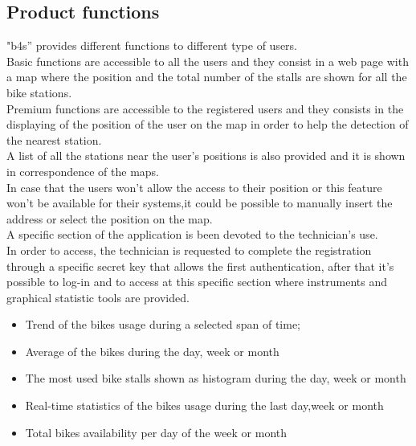 \documentclass{article}
\begin{document}
\subsection{Product functions}
"b4s” provides different functions to different type of users.\\
Basic functions are accessible to all the users and they consist in a web page with a map where the position and the total number of the stalls are shown for all the bike stations.\\
Premium functions are accessible to the registered users and they consists in the displaying of the position of the user on the map in order to help the detection of the nearest station.\\
A list of all the stations near the user's positions is also provided and it is shown in correspondence of the maps.\\
In case that the users won’t allow the access to their position or this feature won't be available for their systems,it could be possible to manually insert the address or select the position on the map.\\
A specific section of the application is been devoted to the technician’s use.\\
In order to access, the technician is requested to complete the registration through a specific secret key that allows the first authentication, after that it's possible to log-in and to access at this specific section where instruments and graphical statistic tools are provided. 
\begin{itemize}
    \item Trend of the bikes usage during a selected span of time;
    \item Average of the bikes during the day, week or month
    \item The most used bike stalls shown as histogram during the day, week or month
    \item Real-time statistics of the bikes usage during the last day,week or month
    \item Total bikes availability per day of the week or month
    
\end{itemize}
\end{document}
